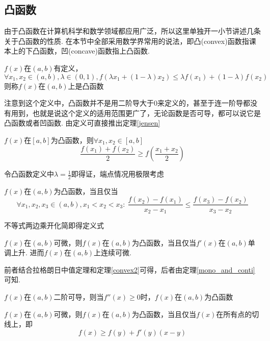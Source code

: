 \subsection{凸函数}
\label{convexfun}
由于凸函数在计算机科学和数学领域都应用广泛，所以这里单独开一小节讲述几条关于凸函数的性质. 在本节中全部采用数学界常用的说法，即凸(convex)函数指课本上的下凸函数，凹(concave)函数指上凸函数.
\begin{definition}[凸函数]
$f(x)$在$(a,b)$有定义，
\[\forall x_1,x_2\in (a,b),\lambda\in(0,1),f(\lambda x_1+(1-\lambda)x_2)\leq\lambda f(x_1)+(1-\lambda)f(x_2)\]
则称$f(x)$在$(a,b)$上是凸函数
\end{definition}
注意到这个定义中，凸函数并不是用二阶导大于$0$来定义的，甚至于连一阶导都没有用到，也就是说这个定义的适用范围更广了，无论函数是否可导，都可以说它是凸函数或者凹函数. 由定义可直接推出定理\ref{jensen}
\begin{theorem}
\label{jensen}
$f(x)$在$[a,b]$为凸函数，则$\forall x_1,x_2\in[a,b]$
\[\frac{f(x_1)+f(x_2)}{2}\geq f\left(\frac{x_1+x_2}{2}\right)\]
\end{theorem}
\begin{analysis}
令凸函数定义中$\displaystyle\lambda=\frac{1}{2}$即得证，端点情况用极限考虑
\end{analysis}
\begin{theorem}
\label{convex2}
$f(x)$在$(a,b)$为凸函数，当且仅当
\[\forall x_1,x_2,x_3\in(a,b),x_1<x_2<x_3:\:\frac{f(x_2)-f(x_1)}{x_2-x_1}\leq\frac{f(x_3)-f(x_2)}{x_3-x_2}\]
\end{theorem}
\begin{analysis}
不等式两边乘开化简即得定义式
\end{analysis}
\begin{theorem}
\label{diff_and_convex}
$f(x)$在$(a,b)$可微，则$f(x)$在$(a,b)$为凸函数，当且仅当$f'(x)$在$(a,b)$单调上升. 进而$f(x)$在$(a,b)$上连续可微. 
\end{theorem}
\begin{analysis}
前者结合拉格朗日中值定理和定理\ref{convex2}可得，后者由定理\ref{mono_and_conti}可知.
\end{analysis}
\begin{corollary2}
$f(x)$在$(a,b)$二阶可导，则当$f''(x)\geq 0$时，$f(x)$在$(a,b)$为凸函数
\end{corollary2}
\begin{theorem}
\label{convex_and_tangent}
$f(x)$在$(a,b)$可微，则$f(x)$在$(a,b)$为凸函数，当且仅当$f(x)$在所有点的切线上，即
\[f(x)\geq f(y)+f'(y)(x-y)\]
\end{theorem}
